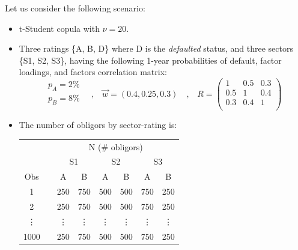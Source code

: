 \documentclass[11pt,fleqn]{book} %
\begin{document}
\begin{example}
	\label{ex:calib}
	Let us consider the following scenario:
	\begin{itemize}
		\item t-Student copula with $\nu=20$.
		\item Three ratings \{A, B, D\} where D is the \emph{defaulted} status, 
		and three sectors \{S1, S2, S3\}, having the following 1-year probabilities 
		of default, factor loadings, and factors correlation matrix:
		\begin{displaymath}
			\begin{array}{l}
				p_A=2\%     \\
				p_B=8\%     \\
			\end{array}
			\quad \text{,} \quad
			\vec{w} = (0.4, 0.25, 0.3)
			\quad \text{,} \quad
			R = \left(
			\begin{array}{ccc}
				1 & 0.5 & 0.3 \\
				0.5 & 1 & 0.4 \\
				0.3 & 0.4 & 1 \\
			\end{array}
			\right) 
		\end{displaymath}
		\item The number of obligors by sector-rating is:\\
		\newline
		\hspace*{1cm}
		\small
		\begin{tabular}{cc|c|c||c|c||c|c|}
			\cline{3-8}
			& & \multicolumn{6}{|c|}{N (\# obligors)} \\
			\cline{3-8}
			& & \multicolumn{2}{|c||}{S1} & \multicolumn{2}{|c||}{S2} & \multicolumn{2}{|c|}{S3} \\
			\cline{1-1} \cline{3-8}
			\multicolumn{1}{|c|}{Obs} & & A & B & A & B & A & B \\
			\cline{1-1} \cline{3-8}
			\multicolumn{1}{|c|}{1} & & 250 & 750 & 500 & 500 & 750 & 250 \\
			\cline{1-1} \cline{3-8}
			\multicolumn{1}{|c|}{2} & & 250 & 750 & 500 & 500 & 750 & 250 \\
			\cline{1-1} \cline{3-8}
			\multicolumn{1}{|c|}{\vdots} & & \vdots & \vdots & \vdots & \vdots & \vdots & \vdots \\
			\cline{1-1} \cline{3-8}
			\multicolumn{1}{|c|}{1000} & & 250 & 750 & 500 & 500 & 750 & 250 \\
			\cline{1-1} \cline{3-8}
		\end{tabular}
	\end{itemize}
	\vspace{11pt}


\end{example}
\end{document}
